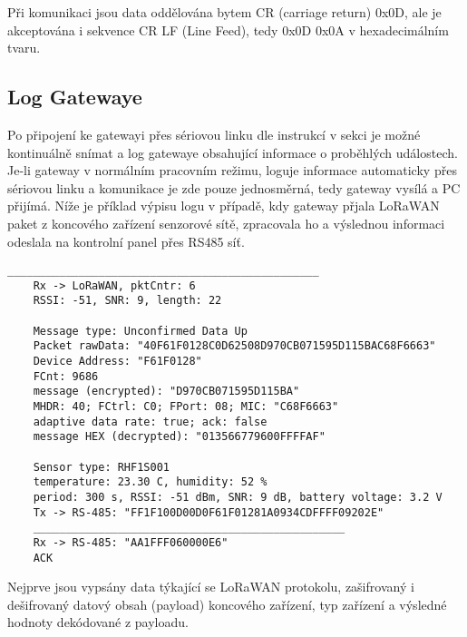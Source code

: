 Při komunikaci jsou data oddělována bytem CR (carriage return) 0x0D, ale je akceptována i sekvence CR LF (Line Feed), tedy 0x0D 0x0A v hexadecimálním tvaru. 

\newpage
\subsection{Log Gatewaye}
Po připojení ke gatewayi přes sériovou linku dle instrukcí v sekci  je možné kontinuálně snímat a log gatewaye obsahující informace o proběhlých událostech. Je-li gateway v normálním pracovním režimu, loguje informace automaticky přes sériovou linku a komunikace je zde pouze jednosměrná, tedy gateway vysílá a PC přijímá.
Níže je příklad výpisu logu v případě, kdy gateway přjala LoRaWAN paket z koncového zařízení senzorové sítě, zpracovala ho a výslednou informaci odeslala na kontrolní panel přes RS485 síť.

\begin{lstlisting}[style=log]
    ________________________________________________
    Rx -> LoRaWAN, pktCntr: 6
    RSSI: -51, SNR: 9, length: 22

    Message type: Unconfirmed Data Up
    Packet rawData: "40F61F0128C0D62508D970CB071595D115BAC68F6663"
    Device Address: "F61F0128"
    FCnt: 9686
    message (encrypted): "D970CB071595D115BA"
    MHDR: 40; FCtrl: C0; FPort: 08; MIC: "C68F6663"
    adaptive data rate: true; ack: false
    message HEX (decrypted): "013566779600FFFFAF"

    Sensor type: RHF1S001
    temperature: 23.30 C, humidity: 52 %
    period: 300 s, RSSI: -51 dBm, SNR: 9 dB, battery voltage: 3.2 V
    Tx -> RS-485: "FF1F100D00D0F61F01281A0934CDFFFF09202E"
    ________________________________________________
    Rx -> RS-485: "AA1FFF060000E6"
    ACK
\end{lstlisting}

Nejprve jsou vypsány data týkající se LoRaWAN protokolu, zašifrovaný i dešifrovaný datový obsah (payload) koncového zařízení, typ zařízení a výsledné hodnoty dekódované z payloadu.


